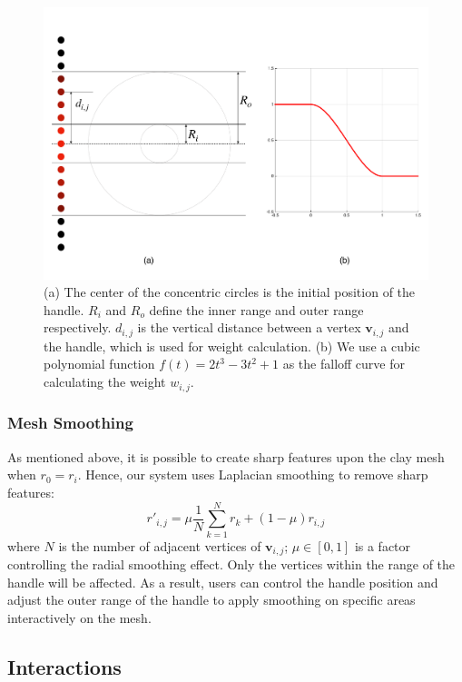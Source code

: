 \documentclass{svjour3}                     %
\begin{document}
\begin{figure}
\includegraphics[width=\textwidth]{fig6.pdf}
\caption{(a) The center of the concentric circles is the initial position of the handle. $R_{i}$ and $R_{o}$ define the inner range and outer range respectively. $d_{i,j}$ is the vertical distance between a vertex $\mathbf{v}_{i,j}$ and the handle, which is used for weight calculation. (b) We use a cubic polynomial function $f(t) = 2t^3 - 3t^2 + 1$ as the falloff curve for calculating the weight $w_{i,j}$. }
\label{fig:deform}
\end{figure}

\subsubsection{Mesh Smoothing}
\label{sec:4.2.4}
As mentioned above, it is possible to create sharp features upon the clay mesh when $r_{0} = r_{i}$. Hence, our system uses Laplacian smoothing to remove sharp features: 
\begin{equation}
r'_{i,j} = 
\mu  \frac{1}{N} 
\sum_{k=1}^N r_{k}
+ (1 - \mu)  r_{i,j}
\end{equation}
where $N$ is the number of adjacent vertices of $\mathbf{v}_{i,j}$; $\mu \in [0,1]$ is a factor controlling the radial smoothing effect.
Only the vertices within the range of the handle will be affected.
As a result, users can control the handle position and adjust the outer range of the handle to apply smoothing on specific areas interactively on the mesh.

\subsection{Interactions}
\label{sec:4.3}
\end{document}
